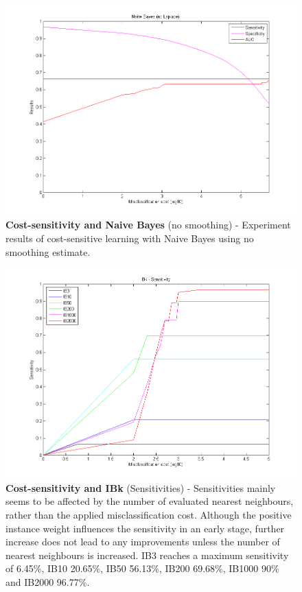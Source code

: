 \newpage
\begin{figure}[h]
\includegraphics[scale=0.65]{img/naivebayes-nolaplace.png}
\caption{\textbf{Cost-sensitivity and Naive Bayes} (no smoothing) - Experiment results of cost-sensitive learning with Naive Bayes using no smoothing estimate.}
\end{figure}

\newpage
\begin{figure}[h]
\includegraphics[scale=0.65]{img/IBk_sens.png}
\caption{\textbf{Cost-sensitivity and IBk} (Sensitivities) - Sensitivities mainly seems to be affected by the number of evaluated nearest neighbours, rather than the applied misclassification cost. Although the positive instance weight influences the sensitivity in an early stage, further increase does not lead to any improvements unless the number of nearest neighbours is increased. IB3 reaches a maximum sensitivity of 6.45\%, IB10 20.65\%, IB50 56.13\%, IB200 69.68\%, IB1000 90\% and IB2000 96.77\%.}
\end{figure}

